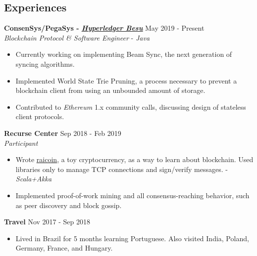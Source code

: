 \documentclass[overlapped]{res}
\begin{document}

\address{\href{rai.dev}{\underline{rai.dev}} \\ \href{https://www.github.com/ratanrsur}{\underline{github.com/ratanrsur}}}
\address{\href{mailto:ratan.r.sur@gmail.com}{\underline{ratan.r.sur@gmail.com}} \\ \hfill +1 646 410 6411\\\hfill{}US Citizen}
\begin{resume}


    \section{Experiences}

    {\bf ConsenSys/PegaSys - \href{https://www.github.com/Hyperledger/Besu}{\underline{\em Hyperledger Besu}}} \hfill May 2019 - Present \\
    {\em Blockchain Protocol \& Software Engineer\/} - {\em Java}
    \begin{itemize} \itemsep-2pt
        \item Currently working on implementing Beam Sync, the next generation of syncing algorithms.
        \item
            Implemented World State Trie Pruning, a process necessary to prevent a blockchain client from using an unbounded amount of storage.
        \item
            Contributed to {\em Ethereum\/} 1.x community calls, discussing design of stateless client protocols.
    \end{itemize}

    {\bf Recurse Center} \hfill Sep 2018 - Feb 2019 \\
    {\em Participant\/}
    \begin{itemize} \itemsep-2pt
        \item
            Wrote \href{https://www.github.com/ratanrsur/raicoin}{\underline{raicoin}}, a toy cryptocurrency, as a way to learn about blockchain.
            Used libraries only to manage TCP connections and sign/verify messages. - {\em Scala+Akka}
        \item
            Implemented proof-of-work mining and all consensus-reaching behavior, such as peer discovery and block gossip.
    \end{itemize}

    {\bf Travel} \hfill Nov 2017 - Sep 2018
    \begin{itemize} \itemsep-2pt
        \item
            Lived in Brazil for 5 months learning Portuguese.
            Also visited India, Poland, Germany, France, and Hungary.
    \end{itemize}



\end{resume}
\end{document}
